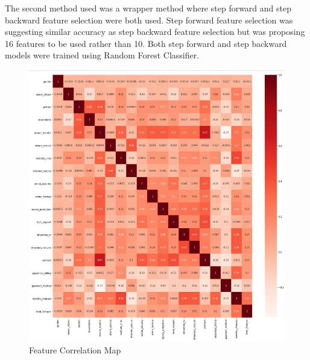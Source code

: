 \documentclass[12pt, a4paper]{article}
\begin{document}
The second method used was a wrapper method where step forward and step backward feature selection were both used. Step forward feature selection was suggesting similar accuracy as step backward feature selection but was proposing 16 features to be used rather than 10. Both step forward and step backward models were trained using Random Forest Classifier.
\begin{figure}[!ht]
    \centering
    \caption{Feature Correlation Map}
    \includegraphics[scale=0.5]{photos/heatmap.JPG}
\end{figure}
\end{document}
